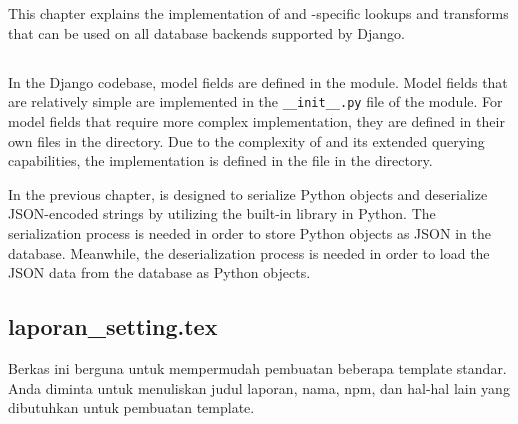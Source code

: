 \chapter{\babEmpat}

This chapter explains the implementation of  and
-specific lookups and transforms that can be used on all
database backends supported by Django.

\section{}

In the Django codebase, model fields are defined in the
 module. Model fields that are relatively simple
are implemented in the \verb|__init__.py| file of the module. For model fields
that require more complex implementation, they are defined in their own files in
the  directory. Due to the complexity of  and its
extended querying capabilities, the implementation is defined in the
 file in the  directory.

In the previous chapter,  is designed to serialize Python
objects and deserialize JSON-encoded strings by utilizing the built-in
 library in Python. The serialization process is needed in order to
store Python objects as JSON in the database. Meanwhile, the deserialization
process is needed in order to load the JSON data from the database as Python
objects.



\section{laporan\_setting.tex}
Berkas ini berguna untuk mempermudah pembuatan beberapa template standar.
Anda diminta untuk menuliskan judul laporan, nama, npm, dan hal-hal lain yang dibutuhkan untuk pembuatan template.


